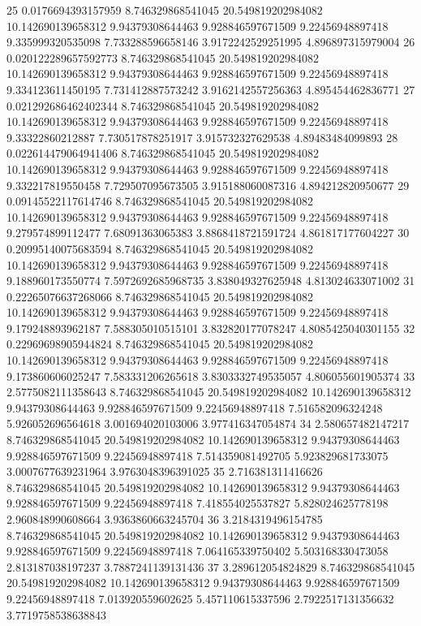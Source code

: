 {25 0.0176694393157959 8.746329868541045 20.549819202984082 10.142690139658312 9.94379308644463 9.928846597671509 9.22456948897418 9.335999320535098 7.733288596658146 3.9172242529251995 4.896897315979004
26 0.020122289657592773 8.746329868541045 20.549819202984082 10.142690139658312 9.94379308644463 9.928846597671509 9.22456948897418 9.334123611450195 7.731412887573242 3.9162142557256363 4.895454462836771
27 0.021292686462402344 8.746329868541045 20.549819202984082 10.142690139658312 9.94379308644463 9.928846597671509 9.22456948897418 9.33322860212887 7.730517878251917 3.915732327629538 4.89483484099893
28 0.022614479064941406 8.746329868541045 20.549819202984082 10.142690139658312 9.94379308644463 9.928846597671509 9.22456948897418 9.332217819550458 7.729507095673505 3.915188060087316 4.894212820950677
29 0.09145522117614746 8.746329868541045 20.549819202984082 10.142690139658312 9.94379308644463 9.928846597671509 9.22456948897418 9.279574899112477 7.68091363065383 3.8868418721591724 4.861817177604227
30 0.20995140075683594 8.746329868541045 20.549819202984082 10.142690139658312 9.94379308644463 9.928846597671509 9.22456948897418 9.188960173550774 7.5972692685968735 3.838049327625948 4.813024633071002
31 0.22265076637268066 8.746329868541045 20.549819202984082 10.142690139658312 9.94379308644463 9.928846597671509 9.22456948897418 9.179248893962187 7.588305010515101 3.832820177078247 4.8085425040301155
32 0.22969698905944824 8.746329868541045 20.549819202984082 10.142690139658312 9.94379308644463 9.928846597671509 9.22456948897418 9.173860606025247 7.583331206265618 3.8303332749535057 4.806055601905374
33 2.5775082111358643 8.746329868541045 20.549819202984082 10.142690139658312 9.94379308644463 9.928846597671509 9.22456948897418 7.516582096324248 5.926052696564618 3.001694020103006 3.977416347054874
34 2.580657482147217 8.746329868541045 20.549819202984082 10.142690139658312 9.94379308644463 9.928846597671509 9.22456948897418 7.514359081492705 5.923829681733075 3.0007677639231964 3.9763048396391025
35 2.716381311416626 8.746329868541045 20.549819202984082 10.142690139658312 9.94379308644463 9.928846597671509 9.22456948897418 7.418554025537827 5.828024625778198 2.960848990608664 3.9363860663245704
36 3.2184319496154785 8.746329868541045 20.549819202984082 10.142690139658312 9.94379308644463 9.928846597671509 9.22456948897418 7.064165339750402 5.503168330473058 2.813187038197237 3.7887241139131436
37 3.289612054824829 8.746329868541045 20.549819202984082 10.142690139658312 9.94379308644463 9.928846597671509 9.22456948897418 7.013920559602625 5.457110615337596 2.7922517131356632 3.7719758538638843
}

